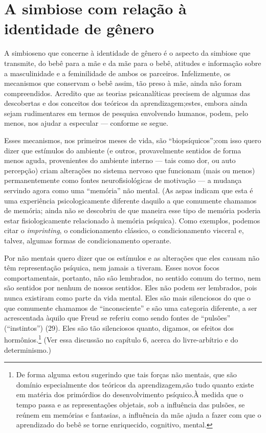 \section{A simbiose com relação à identidade de gênero}

A simbiose\idxidengen[|(] no que concerne à identidade\idxident{} de gênero é o aspecto da
simbiose\idxfeminsimb{} que transmite, do bebê para a mãe\idxidentsimb{} e da mãe para o bebê,
atitudes e informação sobre a masculinidade e a feminilidade\idxmascufas{} de ambos
os parceiros. Infelizmente, os mecanismos que conservam o bebê assim,
tão preso à mãe, ainda não foram compreendidos. Acredito que as
teorias psicanalíticas precisem de algumas das descobertas e dos
conceitos dos teóricos da aprendizagem;\idxsocia[|(] estes, embora ainda sejam
rudimentares em termos de pesquisa envolvendo humanos, podem, pelo
menos, nos ajudar a especular --- conforme se segue.

Esses mecanismos, nos primeiros meses de vida, são
``biopsíquicos'';\idxmecan[|(] com isso quero dizer que
estímulos do ambiente (e outros, provavelmente sentidos de forma menos
aguda, provenientes do ambiente interno --- tais como dor, ou auto
percepção) criam alterações no sistema nervoso que funcionam (mais ou
menos) permanentemente como fontes neurofisiológicas de motivação ---
a mudança servindo agora como uma ``memória''\idxnaome{}
não mental. (As aspas indicam que esta é uma experiência
psicologicamente diferente daquilo a que comumente chamamos de memória;
ainda não se descobriu de que maneira esse tipo de memória poderia
estar fisiologicamente relacionado à memória psíquica). Como exemplos,
podemos citar o \emph{imprinting},\idxestam{} o condicionamento clássico, o
condicionamento\idxcond{} visceral e, talvez, algumas formas de condicionamento
operante.

Por não mentais quero dizer que os estímulos e as alterações que
eles causam não têm representação psíquica, nem jamais a tiveram. Esses
novos focos comportamentais, portanto, não são lembrados, no sentido
comum do termo, nem são sentidos por nenhum de nossos sentidos. Eles
não podem ser lembrados, pois nunca existiram como parte da vida
mental. Eles são mais silenciosos do que o que comumente chamamos de
``inconsciente'' e são uma categoria
diferente, a ser acrescentada àquilo que Freud\idxfreudinsti{} se referiu como sendo
fontes de ``pulsões'' (``instintos'') (29). Eles são tão
silenciosos quanto, digamos, os efeitos dos hormônios.\footnote{ De
forma alguma estou sugerindo que tais forças não mentais, que são
domínio especialmente dos teóricos da aprendizagem,\idxsocia[|)] são tudo quanto
existe em matéria dos primórdios do desenvolvimento psíquico.\idxmecan[|)] À medida que
o tempo passa e as representações objetais, sob a influência das
pulsões, se reúnem em memórias e fantasias, a influência da mãe ajuda a
fazer com que o aprendizado do bebê se torne enriquecido, cognitivo,
mental.} (Ver essa discussão no capítulo 6, acerca do livre-arbítrio e
do determinismo.)

